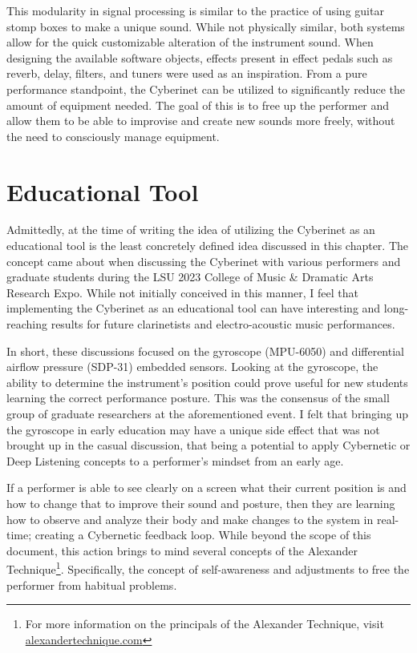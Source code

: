 This modularity in signal processing is similar to the practice of using guitar stomp boxes to make a unique sound. While not physically similar, both systems allow for the quick customizable alteration of the instrument sound. When designing the available software objects, effects present in effect pedals such as reverb, delay, filters, and tuners were used as an inspiration. From a pure performance standpoint, the Cyberinet can be utilized to significantly reduce the amount of equipment needed. The goal of this is to free up the performer and allow them to be able to improvise and create new sounds more freely, without the need to consciously manage equipment.

\section{Educational Tool}
Admittedly, at the time of writing the idea of utilizing the Cyberinet as an educational tool is the least concretely defined idea discussed in this chapter. The concept came about when discussing the Cyberinet with various performers and graduate students during the LSU 2023 College of Music \& Dramatic Arts Research Expo. While not initially conceived in this manner, I feel that implementing the Cyberinet as an educational tool can have interesting and long-reaching results for future clarinetists and electro-acoustic music performances. 

In short, these discussions focused on the gyroscope (MPU-6050) and differential airflow pressure (SDP-31) embedded sensors. Looking at the gyroscope, the ability to determine the instrument's position could prove useful for new students learning the correct performance posture. This was the consensus of the small group of graduate researchers at the aforementioned event. I felt that bringing up the gyroscope in early education may have a unique side effect that was not brought up in the casual discussion, that being a potential to apply Cybernetic or Deep Listening concepts to a performer's mindset from an early age.

If a performer is able to see clearly on a screen what their current position is and how to change that to improve their sound and posture, then they are learning how to observe and analyze their body and make changes to the system in real-time; creating a Cybernetic feedback loop\cite{WeinerCybernetics2019}. While beyond the scope of this document, this action brings to mind several concepts of the Alexander Technique\footnote{For more information on the principals of the Alexander Technique, visit \url{alexandertechnique.com}}. Specifically, the concept of self-awareness and adjustments to free the performer from habitual problems\cite{gelbBodyLearning2013}.


